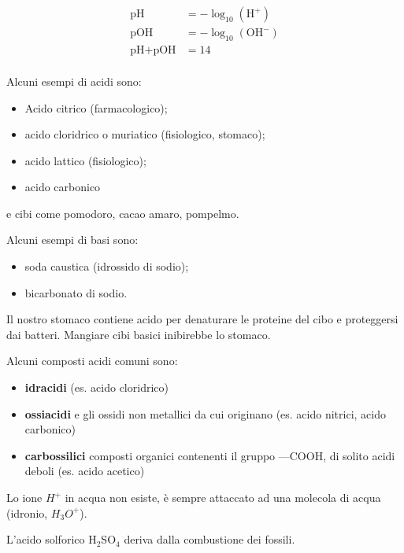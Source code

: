 \documentclass[a4paper]{article}
\begin{document}
\begin{align*}
    \text{pH} &= - \log_{10}(\text{H}^+) \\
    \text{pOH} &= - \log_{10}(\text{OH}^-) \\
    \text{pH} + \text{pOH} &= 14 \\
\end{align*}

Alcuni esempi di acidi sono:
\begin{itemize}
    \item Acido citrico (farmacologico);
    \item acido cloridrico o muriatico (fisiologico, stomaco);
    \item acido lattico (fisiologico);
    \item acido carbonico
\end{itemize}
e cibi come pomodoro, cacao amaro, pompelmo.

Alcuni esempi di basi sono:
\begin{itemize}
    \item soda caustica (idrossido di sodio);
    \item bicarbonato di sodio.
\end{itemize}

Il nostro stomaco contiene acido per denaturare le proteine
del cibo e proteggersi dai batteri.
Mangiare cibi basici inibirebbe lo stomaco.

Alcuni composti acidi comuni sono:
\begin{itemize}
    \item \textbf{idracidi} (es. acido cloridrico)
    \item \textbf{ossiacidi} e gli ossidi non metallici da cui originano (es. acido nitrici, acido carbonico)
    \item \textbf{carbossilici} composti organici contenenti il gruppo —COOH,
        di solito acidi deboli (es. acido acetico)
\end{itemize}

Lo ione \(H^+\) in acqua non esiste, è sempre attaccato ad una molecola di acqua (idronio, \(H_3O^+\)).

L'acido solforico H\({}_2\)SO\({}_4\) deriva dalla combustione dei fossili.
\end{document}
